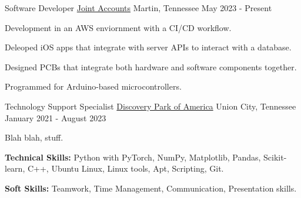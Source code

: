 
\begin{cventries}


  \cventry
    {Software Developer} %
    {\href{https://www.jointaccounts.com}{Joint Accounts}} %
    {Martin, Tennessee} %
    {May 2023 - Present} %
    {
		\begin{cvitems}
      		\item Development in an AWS enviornment with a CI/CD workflow.
      		\item Deleoped iOS apps that integrate with server APIs to interact with a database.
      		\item Designed PCBs that integrate both hardware and software components together.
      		\item Programmed for Arduino-based microcontrollers. 
		\end{cvitems}
   	}


  \cventry
    {Technology Support Specialist} %
    {\href{https://discoveryparkofamerica.com/}{Discovery Park of America}} %
    {Union City, Tennessee} %
    {January 2021 - August 2023} %
    {
      \begin{cvitems} %
        \item Blah blah, stuff.
        \item {\textbf{Technical Skills:} Python with PyTorch, NumPy, Matplotlib, Pandas, Scikit-learn, C++, Ubuntu Linux, Linux tools, Apt, Scripting, Git.}
        \item {\textbf{Soft Skills:} Teamwork, Time Management, Communication, Presentation skills.}
      \end{cvitems}
    }

\end{cventries}
